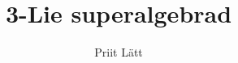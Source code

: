 \documentclass[12pt,a4paper]{article}
\author{Priit Lätt}
\title{3-Lie superalgebrad}
\numberwithin{equation}{section}
\theoremstyle{plain}
\theoremstyle{definition}
\theoremstyle{remark}
\begin{document}
\tableofcontents{}
\newpage



\newpage


\newpage


\newpage


\newpage




\newpage


\end{document}
